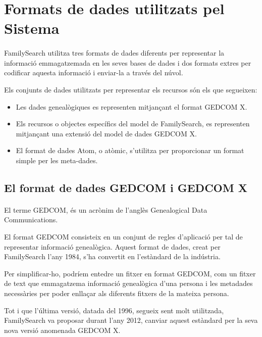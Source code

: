 \section{Formats de dades utilitzats pel Sistema}

    \paragraph{}
    FamilySearch utilitza tres formats de dades diferents per representar la informació emmagatzemada en les seves bases de dades i dos formats extres per codificar aquesta informació i enviar-la a través del núvol.

    Els conjunts de dades utilitzats per representar els recursos són els que segueixen:

    \begin{itemize}
        \item Les dades genealògiques es representen mitjançant el format GEDCOM X.
        \item Els recursos o objectes específics del model de FamilySearch, es representen mitjançant una extensió del model de dades GEDCOM X.
        \item El format de dades Atom, o atòmic, s’utilitza per proporcionar un format simple per les meta-dades.
    \end{itemize}


    \subsection{El format de dades GEDCOM i GEDCOM X}

        \paragraph{}
        El terme \gls{GEDCOM}, és un acrònim de l'anglès Genealogical Data Communications.

        El format GEDCOM consisteix en un conjunt de regles d'aplicació per tal de representar informació genealògica. Aquest format de dades, creat per FamilySearch l'any 1984, s'ha convertit en l'estàndard de la indústria.

         Per simplificar-ho, podríem entedre un fitxer en format GEDCOM, com un fitxer de text que emmagatzema informació genealògica d’una persona i les metadades necessàries per poder enllaçar als diferents fitxers de la mateixa persona.

         Tot i que l’última versió, datada del 1996, segueix sent molt utilitzada, FamilySearch va proposar durant l'any 2012, canviar aquest estàndard per la seva nova versió anomenada GEDCOM X.

